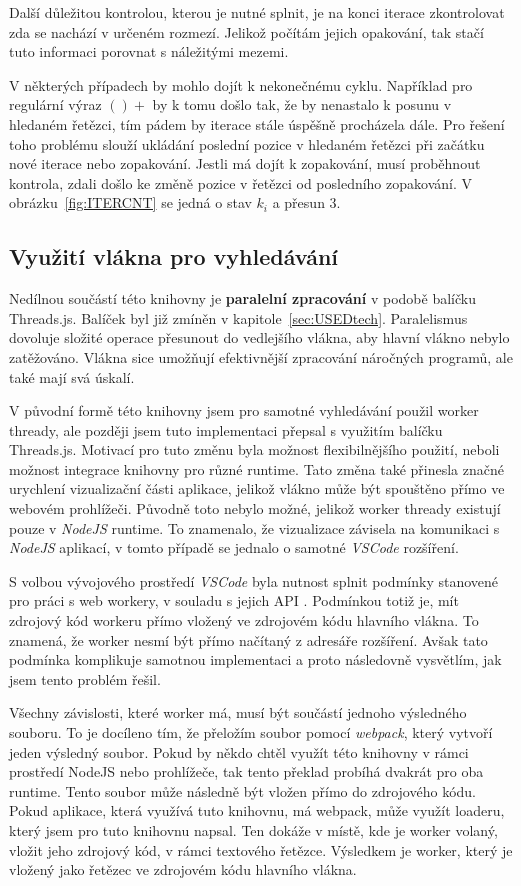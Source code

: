 Další důležitou kontrolou, kterou je nutné splnit, je na konci iterace zkontrolovat zda se nachází v určeném rozmezí.
Jelikož počítám jejich opakování, tak stačí tuto informaci porovnat s náležitými mezemi.

V některých případech by mohlo dojít k nekonečnému cyklu.
Například pro regulární výraz $()+$ by k tomu došlo tak, že by nenastalo k posunu v hledaném řetězci, tím pádem by iterace stále úspěšně procházela dále.
Pro řešení toho problému slouží ukládání poslední pozice v hledaném řetězci při začátku nové iterace nebo zopakování.
Jestli má dojít k zopakování, musí proběhnout kontrola, zdali došlo ke změně pozice v řetězci od posledního zopakování.
V obrázku~\ref{fig:ITERCNT} se jedná o stav $k_i$ a přesun $3$.

\subsection*{Využití vlákna pro vyhledávání}
Nedílnou součástí této knihovny je \textbf{paralelní zpracování} v podobě balíčku Threads.js.
Balíček byl již zmíněn v kapitole~\ref{sec:USEDtech}.
Paralelismus dovoluje složité operace přesunout do vedlejšího vlákna, aby hlavní vlákno nebylo zatěžováno.
Vlákna sice umožňují efektivnější zpracování náročných programů, ale také mají svá úskalí.

V původní formě této knihovny jsem pro samotné vyhledávání použil worker thready, ale později jsem tuto implementaci přepsal s využitím balíčku Threads.js.
Motivací pro tuto změnu byla možnost flexibilnějšího použití, neboli možnost integrace knihovny pro různé runtime.
Tato změna také přinesla značné urychlení vizualizační části aplikace, jelikož vlákno může být spouštěno přímo ve webovém prohlížeči.
Původně toto nebylo možné, jelikož worker thready existují pouze v \textit{NodeJS} runtime.
To znamenalo, že vizualizace závisela na komunikaci s \textit{NodeJS} aplikací, v tomto případě se jednalo o samotné \textit{VSCode} rozšíření.

S volbou vývojového prostředí \textit{VSCode} byla nutnost splnit podmínky stanovené pro práci s web workery, v souladu s jejich API \cite{Microsoft_2021}. 
Podmínkou totiž je, mít zdrojový kód workeru přímo vložený ve zdrojovém kódu hlavního vlákna.
To znamená, že worker nesmí být přímo načítaný z adresáře rozšíření.
Avšak tato podmínka komplikuje samotnou implementaci a proto následovně vysvětlím, jak jsem tento problém řešil.

Všechny závislosti, které worker má, musí být součástí jednoho výsledného souboru.
To je docíleno tím, že přeložím soubor pomocí \textit{webpack}, který vytvoří jeden výsledný soubor.
Pokud by někdo chtěl využít této knihovny v rámci prostředí NodeJS nebo prohlížeče, tak tento překlad probíhá dvakrát pro oba runtime.
Tento soubor může následně být vložen přímo do zdrojového kódu.
Pokud aplikace, která využívá tuto knihovnu, má webpack, může využít loaderu, který jsem pro tuto knihovnu napsal. 
Ten dokáže v místě, kde je worker volaný, vložit jeho zdrojový kód, v rámci textového řetězce.
Výsledkem je worker, který je vložený jako řetězec ve zdrojovém kódu hlavního vlákna.

